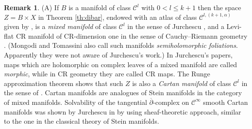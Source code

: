 \documentclass[11pt]{amsart}
\numberwithin{equation}{section}
\theoremstyle{definition}
\newtheorem{remark}[theorem]{Remark}
\newcommand\Cscr{\mathscr{C}}
\newcommand\dibar{\overline\partial}
\begin{document}
%
%
\begin{remark}%
\label{rem:Cartan}
(A) If $B$ is a manifold of class $\Cscr^l$ with 
$0<l\le k+1$ then the space $Z=B\times X$ in 
Theorem \ref{th:dibar}, endowed with an atlas 
of class $\Cscr^{l,(k+1,\alpha)}$ given by 
\cite[Theorem 4.1]{Forstneric2024Runge},
is a {\em mixed manifold} of class $\Cscr^l$
in the sense of %
Jurchescu \cite{Jurchescu1979,Jurchescu1988RRMPA},
and a Levi-flat CR manifold of CR-dimension one in the 
sense of Cauchy--Riemann geometry \cite{BaouendiEbenfeltRothschild1999}. 
(Mongodi and Tomassini \cite{MongodiTomassini2019} also call 
such manifolds {\em semiholomorphic foliations}. Apparently they
were not aware of Jurchescu's work.) 
In Jurchescu's papers, maps which are holomorphic on complex leaves of a mixed manifold are called {\em morphic}, while in CR geometry they are called CR maps. The Runge approximation theorem 
\cite[Theorem 1.1]{Forstneric2024Runge} 
shows that such $Z$ is also a {\em Cartan manifold} of class $\Cscr^{l}$ 
in the sense of \cite[Sect.\ 6]{Jurchescu1988RRMPA}.
Cartan manifolds are analogues of Stein manifolds in 
the category of mixed manifolds. 
%
%
Solvability of the tangential $\dibar$-complex on $\Cscr^\infty$  
smooth Cartan manifolds was shown by Jurchescu in
\cite[Sect.\ 3]{Jurchescu1994} by using sheaf-theoretic approach,
similar to the one in the classical theory of Stein manifolds. 


\end{remark}
\end{document}
